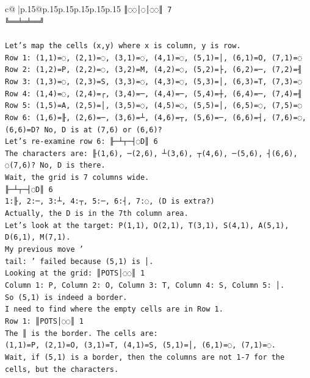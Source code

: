 \documentclass{article}
\begin{document}
{\begin{supertabular}{c@{$\;$}|p{.15\linewidth}@{}p{.15\linewidth}p{.15\linewidth}p{.15\linewidth}p{.15\linewidth}p{.15\linewidth}}
{{{\texttt{║◌◌│◌│◌◌║ 7} \\
\texttt{╚══╧═╧══╝} \\
\\ 
\texttt{Let's map the cells (x,y) where x is column, y is row.} \\
\texttt{Row 1: (1,1)=◌, (2,1)=◌, (3,1)=◌, (4,1)=◌, (5,1)=│, (6,1)=O, (7,1)=◌} \\
\texttt{Row 2: (1,2)=P, (2,2)=◌, (3,2)=M, (4,2)=◌, (5,2)=├, (6,2)=─, (7,2)=╢} \\
\texttt{Row 3: (1,3)=◌, (2,3)=S, (3,3)=◌, (4,3)=◌, (5,3)=│, (6,3)=T, (7,3)=◌} \\
\texttt{Row 4: (1,4)=◌, (2,4)=┌, (3,4)=─, (4,4)=─, (5,4)=┼, (6,4)=─, (7,4)=╢} \\
\texttt{Row 5: (1,5)=A, (2,5)=│, (3,5)=◌, (4,5)=◌, (5,5)=│, (6,5)=◌, (7,5)=◌} \\
\texttt{Row 6: (1,6)=╟, (2,6)=─, (3,6)=┴, (4,6)=┬, (5,6)=─, (6,6)=┤, (7,6)=◌, (6,6)=D? No, D is at (7,6) or (6,6)?} \\
\texttt{Let's re{-}examine row 6: ╟─┴┬─┤◌D║ 6} \\
\texttt{The characters are: ╟(1,6), ─(2,6), ┴(3,6), ┬(4,6), ─(5,6), ┤(6,6), ◌(7,6)? No, D is there.} \\
\texttt{Wait, the grid is 7 columns wide.} \\
\texttt{╟─┴┬─┤◌D║ 6} \\
\texttt{1:╟, 2:─, 3:┴, 4:┬, 5:─, 6:┤, 7:◌, (D is extra?)} \\
\texttt{Actually, the D is in the 7th column area.} \\
\texttt{Let's look at the target: P(1,1), O(2,1), T(3,1), S(4,1), A(5,1), D(6,1), M(7,1).} \\
\texttt{My previous move '} \\
\texttt{tail: ' failed because (5,1) is │.} \\
\texttt{Looking at the grid: ║POTS│◌◌║ 1} \\
\texttt{Column 1: P, Column 2: O, Column 3: T, Column 4: S, Column 5: │.} \\
\texttt{So (5,1) is indeed a border.} \\
\texttt{I need to find where the empty cells are in Row 1.} \\
\texttt{Row 1: ║POTS│◌◌║ 1} \\
\texttt{The ║ is the border. The cells are:} \\
\texttt{(1,1)=P, (2,1)=O, (3,1)=T, (4,1)=S, (5,1)=│, (6,1)=◌, (7,1)=◌.} \\
\texttt{Wait, if (5,1) is a border, then the columns are not 1{-}7 for the cells, but the characters.} \\
}}}
\end{supertabular}}
\end{document}
